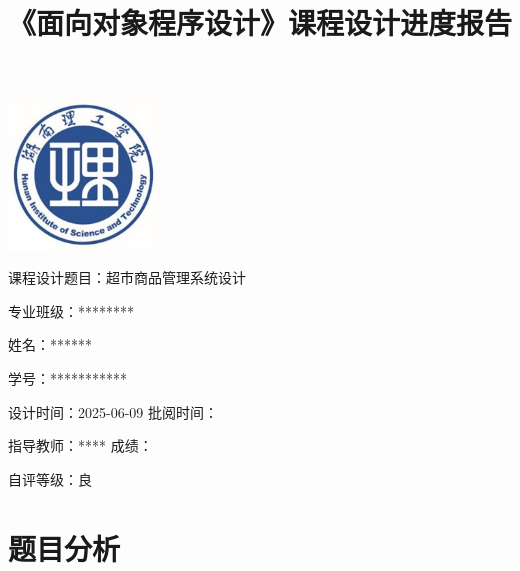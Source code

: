 \documentclass[12pt, a4paper, oneside]{ctexart}
\title{\kaishu\fontsize{20pt}{20pt}\selectfont 《面向对象程序设计》课程设计进度报告}
\date{}
\begin{document}
\maketitle

\vspace{-6em}  %
\centering
\includegraphics[width=0.3\textwidth]{../images/湖南理工学院logo..png}

\vspace{2em}
\begin{flushleft}
\songti\fontsize{18pt}{18pt}\selectfont 课程设计题目：超市商品管理系统设计

\vspace{1em}
\songti\fontsize{18pt}{18pt}\selectfont \hspace{2em}专业班级：********

\vspace{1em}
\songti\fontsize{18pt}{18pt}\selectfont \hspace{4em}姓名：******

\vspace{1em}
\songti\fontsize{18pt}{18pt}\selectfont \hspace{4em}学号：***********

\vspace{1em}
\songti\fontsize{18pt}{18pt}\selectfont 设计时间：2025-06-09 \hspace{4em}批阅时间：

\vspace{1em}
\songti\fontsize{18pt}{18pt}\selectfont 指导教师：**** \hspace{8em} 成绩：

\vspace{1em}
\songti\fontsize{18pt}{18pt}\selectfont 自评等级：良
\end{flushleft}

\newpage %

\clearpage
\tableofcontents
\clearpage

\newpage %


\section{题目分析}
\end{document}
